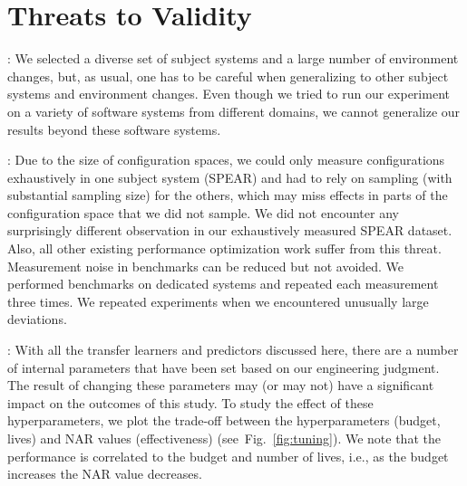 \documentclass[10pt,journal,compsoc]{IEEEtran}
\newcommand{\fig}[1]{Fig.~\ref{fig:#1}}
\begin{document}
\section{Threats to Validity}
\label{sect:threats}

: We selected a diverse set of subject systems and a large number of environment changes, but, as usual, one has to be careful when generalizing to other subject systems and environment changes. Even though we tried to run our experiment on a variety of software systems from different domains, we cannot generalize our results beyond these software systems.


: Due to the size of configuration spaces, we could only measure configurations exhaustively in one subject system (SPEAR) and had to rely on sampling (with substantial sampling size) for the others, which may miss effects in parts of the configuration space that we did not sample. We did not encounter any surprisingly different observation in our exhaustively measured {\sc SPEAR} dataset. Also, all other existing performance optimization work suffer from this threat.
Measurement noise in benchmarks can be reduced but not avoided. We performed benchmarks on dedicated systems and repeated each measurement three times. We repeated experiments when we encountered unusually large deviations.

: With all the transfer learners and predictors discussed here, there
are a number of internal parameters that have been set based on our engineering judgment. The result of changing these parameters may (or may not) have a significant impact on the outcomes of this study. To study the effect of these hyperparameters, we plot the trade-off between the hyperparameters (budget, lives) and NAR values (effectiveness) (see~\fig{tuning}). We note that the performance is correlated to the budget and number of lives, i.e., as the budget increases the NAR value decreases.
\end{document}

